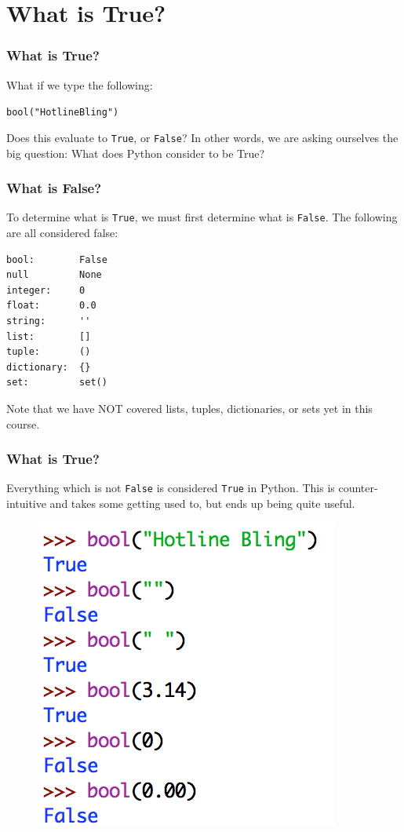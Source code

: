 \documentclass{beamer}
\begin{document}
\section{What is True?}

\begin{frame}[fragile]
\frametitle{What is True?}

What if we type the following:
\begin{alltt}
{\color{purple}bool}({\color{green}"Hotline Bling"})
\end{alltt}
Does this  evaluate to \verb|True|, or \verb|False|? In other words, we are asking ourselves the big question: What does Python consider to be True?
\end{frame}

\begin{frame}[fragile]
\frametitle{What is False?}

To determine what is \verb|True|, we must first determine what is \verb|False|. The following are all considered false:
\begin{verbatim}
bool:        False
null         None
integer:     0
float:       0.0
string:      ''
list:        []
tuple:       ()
dictionary:  {}
set:         set()
\end{verbatim}
Note that we have NOT covered lists, tuples, dictionaries, or sets yet in this course.
\end{frame}

\begin{frame}[fragile]
\frametitle{What is True?}

Everything which is not \verb|False| is considered \verb|True| in Python. This is counter-intuitive and takes some getting used to, but ends up being quite useful.

\begin{figure}\centering
\includegraphics[scale=.8]{IMG/bool.png}
\end{figure}
\end{frame}
\end{document}
